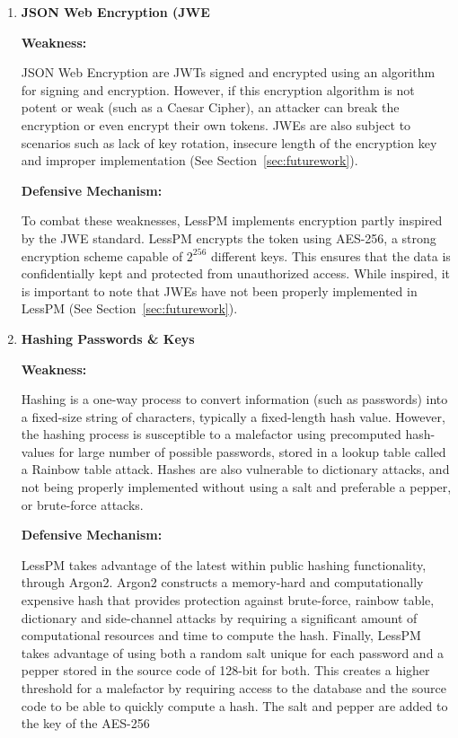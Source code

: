 \begin{enumerate}[label=$\blacktriangleright$]
  \item \textbf{JSON Web Encryption (JWE}

  \textbf{Weakness:}

  JSON Web Encryption are JWTs signed and encrypted using an algorithm for
  signing and encryption.
  However, if this encryption algorithm is not potent or weak (such as a
  Caesar Cipher), an attacker can break the encryption or even encrypt their own
  tokens.
  JWEs are also subject to scenarios such as lack of key rotation, insecure
  length of the encryption key and improper implementation (See
  Section~\ref{sec:futurework}).

  \textbf{Defensive Mechanism:}

  To combat these weaknesses, LessPM implements encryption partly inspired by
  the JWE standard.
  LessPM encrypts the token using AES-256, a strong encryption scheme capable
  of $2^{256}$ different keys.
  This ensures that the data is confidentially kept and protected from
  unauthorized access.
  While inspired, it is important to note that JWEs have not been properly
  implemented in LessPM (See Section~\ref{sec:futurework}).

  \item \textbf{Hashing Passwords \& Keys}

  \textbf{Weakness:}

  Hashing is a one-way process to convert information (such as passwords)
  into a fixed-size string of characters, typically a fixed-length hash value.
  However, the hashing process is susceptible to a malefactor using
  precomputed hash-values for large number of possible passwords, stored in a
  lookup table called a Rainbow table attack.
  Hashes are also vulnerable to dictionary attacks, and not being properly
  implemented without using a salt and preferable a pepper, or brute-force
  attacks.

  \textbf{Defensive Mechanism:}

  LessPM takes advantage of the latest within public hashing functionality,
  through Argon2.
  Argon2 constructs a memory-hard and computationally expensive hash that
  provides protection against brute-force, rainbow table, dictionary and
  side-channel attacks by requiring a significant amount of computational
  resources and time to compute the hash.
  Finally, LessPM takes advantage of using both a random salt unique for each
  password and a pepper stored in the source code of 128-bit for both.
  This creates a higher threshold for a malefactor by requiring access to the
  database and the source code to be able to quickly compute a hash.
  The salt and pepper are added to the key of the AES-256


\end{enumerate}
